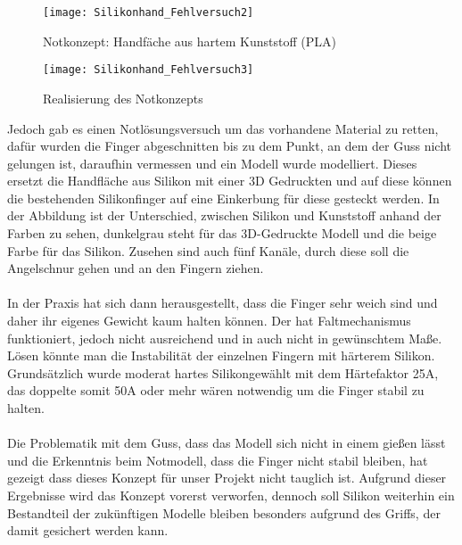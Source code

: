 \documentclass[titlepage,12pt,twoside]{article}
\begin{document}
\begin{figure}[H]
	\begin{center}
		\scalebox{0.8}
		{\texttt{[image: Silikonhand\_Fehlversuch2]}}
		\caption{Notkonzept: Handfäche aus hartem Kunststoff (PLA)}
		\label{fig:Silikonhand_Fehlversuch2}			
	\end{center}
\end{figure}
\begin{figure}[H]
	\begin{center}
		\scalebox{0.8}
		{\texttt{[image: Silikonhand\_Fehlversuch3]}}
		\caption{Realisierung des Notkonzepts}
		\label{fig:Silikonhand_Fehlversuch3}			
	\end{center}
\end{figure}
\hfill \break
Jedoch gab es einen Notlösungsversuch um das vorhandene Material zu retten, dafür wurden die Finger abgeschnitten bis zu dem Punkt, an dem der Guss nicht gelungen ist, daraufhin vermessen und ein Modell wurde modelliert. Dieses ersetzt die Handfläche 
aus Silikon mit einer 3D Gedruckten und auf diese können die bestehenden Silikonfinger auf eine Einkerbung für diese gesteckt werden. In der Abbildung ist der Unterschied, zwischen Silikon und Kunststoff anhand der Farben zu sehen, dunkelgrau steht 
für das 3D-Gedruckte Modell und die beige Farbe für das Silikon. Zusehen sind auch fünf Kanäle, durch diese soll die Angelschnur gehen und an den Fingern ziehen. \\
\\
In der Praxis hat sich dann herausgestellt, dass die Finger sehr weich sind und daher ihr eigenes Gewicht kaum halten können. Der hat Faltmechanismus funktioniert, jedoch nicht ausreichend und in auch nicht in gewünschtem Maße. Lösen könnte man die 
Instabilität der einzelnen Fingern mit härterem Silikon. Grundsätzlich wurde moderat hartes Silikongewählt mit dem Härtefaktor 25A, das doppelte somit 50A oder mehr wären notwendig um die Finger stabil zu halten. \\
\\
Die Problematik mit dem Guss, dass das Modell sich nicht in einem gießen lässt und die Erkenntnis beim Notmodell, dass die Finger nicht stabil bleiben, hat gezeigt dass dieses Konzept für unser Projekt nicht tauglich ist. Aufgrund dieser 
Ergebnisse wird das Konzept vorerst verworfen, dennoch soll Silikon weiterhin ein Bestandteil der zukünftigen Modelle bleiben besonders aufgrund des Griffs, der damit gesichert werden kann. \\
\\
\end{document}

